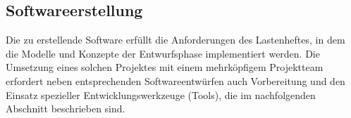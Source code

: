 \subsection{Softwareerstellung}
\label{sec:Softwareerstellung}

Die zu erstellende Software erfüllt die Anforderungen des Lastenheftes, in dem die Modelle und Konzepte der Entwurfsphase implementiert werden. Die Umsetzung eines solchen Projektes mit einem mehrköpfigem Projektteam erfordert neben entsprechenden Softwareentwürfen auch Vorbereitung und den Einsatz spezieller Entwicklungswerkzeuge (Tools), die im nachfolgenden Abschnitt beschrieben sind.